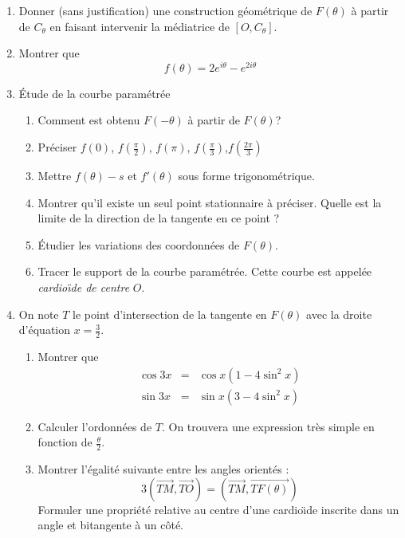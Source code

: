 \begin{enumerate}
  \item Donner (sans justification) une construction g{\'e}om{\'e}trique de $F(\theta)$ {\`a}  partir de $C_\theta$ en faisant intervenir la m{\'e}diatrice de  $[O,C_\theta]$.
  \item Montrer que
  \[f(\theta)=2e^{i\theta}-e^{2i\theta}\]
  \item {\'E}tude de la courbe param{\'e}tr{\'e}e
    \begin{enumerate}
        \item Comment est obtenu $F(-\theta)$ {\`a} partir de $F(\theta)$?
        \item Pr{\'e}ciser $f(0)$, $f(\frac{\pi}{2})$, $f(\pi)$, $f(\frac{\pi}{3})$,$f(\frac{2\pi}{3})$
        \item Mettre $f(\theta)-s$ et $f'(\theta)$ sous forme trigonom{\'e}trique.
        \item Montrer qu'il existe un seul point stationnaire {\`a} pr{\'e}ciser. Quelle est la limite de la direction de la tangente en ce point ?
        \item {\'E}tudier les variations des coordonn{\'e}es de $F(\theta)$.
        \item Tracer le support de la courbe param{\'e}tr{\'e}e. Cette  courbe est appel{\'e}e \emph{cardio{\"\i}de de centre} $O$.
    \end{enumerate}
  \item On note $T$ le point d'intersection de la tangente en $F(\theta)$ avec la droite d'{\'e}quation
  $x=\frac{3}{2}$.

    \begin{enumerate}
        \item Montrer que
        \begin{eqnarray*}
        \cos 3x &=& \cos x (1- 4\sin^2 x)\\
        \sin 3x &=& \sin x (3- 4\sin^2 x)
        \end{eqnarray*}
        \item Calculer l'ordonn{\'e}es de $T$. On trouvera une expression tr{\`e}s simple en fonction de $\frac{\theta}{2}$.
        \item  Montrer l'{\'e}galit{\'e} suivante entre les angles orient{\'e}s : \[3(\overrightarrow{TM},\overrightarrow{TO})=(\overrightarrow{TM},\overrightarrow{TF(\theta)})\]
  Formuler une propri{\'e}t{\'e} relative au centre d'une cardio{\"\i}de inscrite dans un angle et bitangente {\`a} un c{\^o}t{\'e}.
\end{enumerate}

\end{enumerate}
